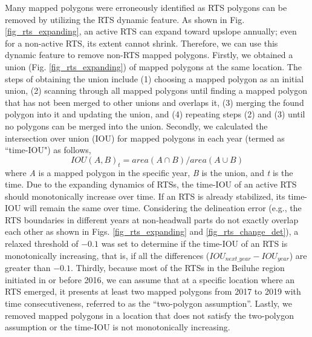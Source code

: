 \documentclass[authoryear,preprint,review,12pt]{elsarticle}
\begin{document}
Many mapped polygons were erroneously identified as RTS polygons can be removed by utilizing the RTS dynamic feature. 
As shown in Fig. \ref{fig_rts_expanding}, an active RTS can expand toward upslope annually; even for a non-active RTS, its extent cannot shrink. 
Therefore, we can use this dynamic feature to remove non-RTS mapped polygons. 
Firstly, we obtained a union (Fig. \ref{fig_rts_expanding}) of mapped polygons at the same location.
The steps of obtaining the union include (1) choosing a mapped polygon as an initial union, (2) scanning through all mapped polygons until finding a mapped polygon that has not been merged to other unions and overlaps it, (3) merging the found polygon into it and updating the union, and (4) repeating steps (2) and (3) until no polygons can be merged into the union. 
Secondly, we calculated the intersection over union (IOU) for mapped polygons in each year (termed as ``time-IOU") as follows, 
\begin{equation}
IOU(A,B)_{t}=area(A \cap B)/area(A \cup B)
\label{equ_time_iou}
\end{equation}
where \emph{A} is a mapped polygon in the specific year, \emph{B} is the union, and \emph{t} is the time. 
Due to the expanding dynamics of RTSs, the time-IOU of an active RTS should monotonically increase over time. 
If an RTS is already stabilized, its time-IOU will remain the same over time. 
Considering the delineation error (e.g., the RTS boundaries in different years at non-headwall parts do not exactly overlap each other as shown in Figs. \ref{fig_rts_expanding} and \ref{fig_rts_change_det}), a relaxed threshold of $-0.1$ was set to determine if the time-IOU of an RTS is monotonically increasing, that is, if all the differences ($IOU_{next\_year}-IOU_{year}$) are greater than $-0.1$.%
Thirdly, because most of the RTSs in the Beiluhe region initiated in or before 2016,
we can assume that at a specific location where an RTS emerged, it presents at least two mapped polygons from 2017 to 2019 with time consecutiveness, referred to as the ``two-polygon assumption''. 
Lastly, we removed mapped polygons in a location that does not satisfy the two-polygon assumption or the time-IOU is not monotonically increasing.
 
\end{document}
